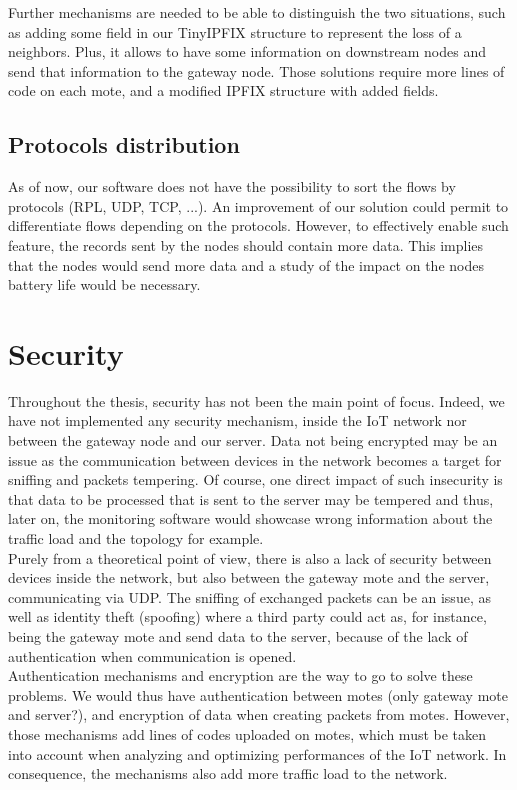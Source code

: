 Further mechanisms are needed to be able to distinguish the two situations, such as adding some field in our TinyIPFIX structure to represent the loss of a neighbors. Plus, it allows to have some information on downstream nodes and send that information to the gateway node. Those solutions require more lines of code on each mote, and a modified IPFIX structure with added fields.

\subsection{Protocols distribution}

As of now, our software does not have the possibility to sort the flows by protocols (RPL, UDP, TCP, ...). An improvement of our solution could permit to differentiate flows depending on the protocols. However, to effectively enable such feature, the records sent by the nodes should contain more data. This implies that the nodes would send more data and a study of the impact on the nodes battery life would be necessary.

\section{Security}

Throughout the thesis, security has not been the main point of focus. Indeed, we have not implemented any security mechanism, inside the IoT network nor between the gateway node and our server. Data not being encrypted may be an issue as the communication between devices in the network becomes a target for sniffing and packets tempering. Of course, one direct impact of such insecurity is that data to be processed that is sent to the server may be tempered and thus, later on, the monitoring software would showcase wrong information about the traffic load and the topology for example.\\

Purely from a theoretical point of view, there is also a lack of security between devices inside the network, but also between the gateway mote and the server, communicating via UDP. The sniffing of exchanged packets can be an issue, as well as identity theft (spoofing) where a third party could act as, for instance, being the gateway mote and send data to the server, because of the lack of authentication when communication is opened. \\

Authentication mechanisms and encryption are the way to go to solve these problems. We would thus have authentication between motes (only gateway mote and server?), and encryption of data when creating packets from motes. However, those mechanisms add lines of codes uploaded on motes, which must be taken into account when analyzing and optimizing performances of the IoT network. In consequence, the mechanisms also add more traffic load to the network.\\

